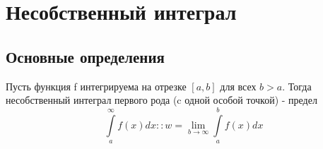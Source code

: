 \chapter{Несобственный интеграл}
\section{Основные определения}
\begin{defin}
Пусть функция f интегрируема на отрезке $[a,b]$ для всех  $b>a$. 
Тогда несобственный интеграл первого рода (c одной особой точкой) - предел 
$$\int\limits_{a}^{\infty}f(x)dx::w=\lim\limits_{b\to\infty}\int\limits_{a}^{b}
f(x)dx$$
\end{defin}

